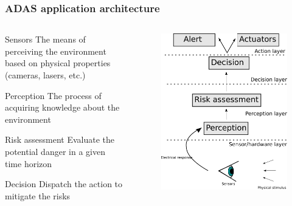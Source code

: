 \documentclass{beamer}
\begin{document}
	\begin{frame}
		\frametitle{ADAS application architecture}	
		\small
		\begin{columns}[t]
		  \begin{column}{6cm}
			\begin{block}{Sensors}
					The means of perceiving the environment based on physical properties (cameras, lasers, etc.)
			\end{block}		

			\begin{block}{Perception}
					The process of acquiring knowledge about the environment \cite{iyengar1991autonomous}
			\end{block}		

			\begin{block}{Risk assessment}
					Evaluate the potential danger in a given time horizon
			\end{block}				  

			\begin{block}{Decision}
					Dispatch the action to mitigate the risks
			\end{block}		
		  
		  \end{column}
		  
		  \begin{column}{6cm}
			\begin{figure}[h]
				\center
				\includegraphics[scale=0.23]{../img/fig:sensors:roles}
			\end{figure}
		  \end{column}
		 \end{columns}		
		
	\end{frame}
		
\end{document}
